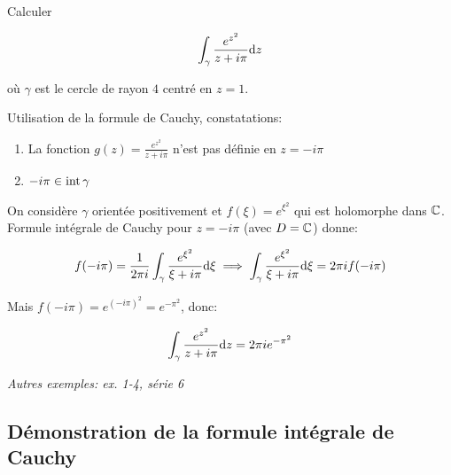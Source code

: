 \begin{example}[2]
    Calculer
    
    \[\int_\gamma \frac{e^{z^2}}{z + i\pi} \mathrm{d}z\]
    
    où $\gamma$ est le cercle de rayon $4$ centré en $z = 1$.
    
    Utilisation de la formule de Cauchy, constatations:
    
    \begin{enumerate}[label=\arabic{enumi})]
    \item 
    La fonction $g(z) = \frac{e^{z^2}}{z + i\pi}$ n'est pas définie en $z = -i\pi$
    \item 
    $-i\pi \in \textrm{int}\,{\gamma}$
    \end{enumerate}

    On considère $\gamma$ orientée positivement et $f(\xi) = e^{\xi^2}$ qui est holomorphe dans $\mathbb{C}$.
    Formule intégrale de Cauchy pour $z = -i\pi$ (avec $D = \mathbb{C}$) donne:
    
    \[
    f(-i\pi) = \frac{1}{2 \pi i} \int_\gamma \frac{e^{\xi^2}}{\xi + i\pi} \mathrm{d}\xi \implies \int_\gamma \frac{e^{\xi^2}}{\xi + i\pi} \mathrm{d}\xi = 2\pi i f(-i\pi)
    \]
    
    Mais $f(-i\pi) = e^{(-i\pi)^2} = e^{-\pi^2}$, donc:
    
    \[\int_\gamma \frac{e^{z^2}}{z + i\pi} \mathrm{d}z = 2\pi i e^{-\pi^2}\]
    
    \textit{Autres exemples: ex. 1-4, série 6}
\end{example}

\subsection{Démonstration de la formule intégrale de Cauchy}

